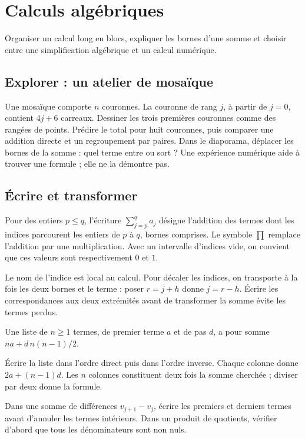 \clearpage
\section{Calculs algébriques}
\begin{objectif}
Organiser un calcul long en blocs, expliquer les bornes d'une somme et choisir entre une simplification algébrique et un calcul numérique.
\end{objectif}
\subsection{Explorer : un atelier de mosaïque}
Une mosaïque comporte $n$ couronnes. La couronne de rang $j$, à partir de $j=0$, contient $4j+6$ carreaux. Dessiner les trois premières couronnes comme des rangées de points. Prédire le total pour huit couronnes, puis comparer une addition directe et un regroupement par paires.
Dans le diaporama, déplacer les bornes de la somme : quel terme entre ou sort ? Une expérience numérique aide à trouver une formule ; elle ne la démontre pas.
\subsection{Écrire et transformer}
\begin{definition}[indices]
Pour des entiers $p\leq q$, l'écriture $\sum_{j=p}^{q}a_j$ désigne l'addition des termes dont les indices parcourent les entiers de $p$ à $q$, bornes comprises. Le symbole $\prod$ remplace l'addition par une multiplication. Avec un intervalle d'indices vide, on convient que ces valeurs sont respectivement $0$ et $1$.
\end{definition}
Le nom de l'indice est local au calcul. Pour décaler les indices, on transporte à la fois les deux bornes et le terme : poser $r=j+h$ donne $j=r-h$. Écrire les correspondances aux deux extrémités avant de transformer la somme évite les termes perdus.
\begin{propriete}
Une liste de $n\geq1$ termes, de premier terme $a$ et de pas $d$, a pour somme $na+d\,n(n-1)/2$.
\end{propriete}
\begin{demonstration}
Écrire la liste dans l'ordre direct puis dans l'ordre inverse. Chaque colonne donne $2a+(n-1)d$. Les $n$ colonnes constituent deux fois la somme cherchée ; diviser par deux donne la formule.
\end{demonstration}
\begin{methode}[annulations]
Dans une somme de différences $v_{j+1}-v_j$, écrire les premiers et derniers termes avant d'annuler les termes intérieurs. Dans un produit de quotients, vérifier d'abord que tous les dénominateurs sont non nuls.
\end{methode}
